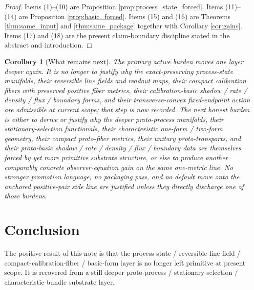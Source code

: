 \documentclass[11pt]{article}
\newtheorem{corollary}{Corollary}
\begin{document}
\begin{proof}
Items (1)--(10) are Proposition \ref{prop:process_state_forced}. Items (11)--(14) are Proposition \ref{prop:basic_forced}. Items (15) and (16) are Theorems \ref{thm:same_input} and \ref{thm:same_package} together with Corollary \ref{cor:gains}. Items (17) and (18) are the present claim-boundary discipline stated in the abstract and introduction.
\end{proof}

\begin{corollary}[What remains next]
\label{cor:what_next}
The primary active burden moves one layer deeper again. It is no longer to justify why the exact-preserving process-state manifolds, their reversible line fields and readout maps, their compact calibration fibers with preserved positive fiber metrics, their calibration-basic shadow / rate / density / flux / boundary forms, and their transverse-convex fixed-endpoint action are admissible at current scope; that step is now recorded. The next honest burden is either to derive or justify why the deeper proto-process manifolds, their stationary-selection functionals, their characteristic one-form / two-form geometry, their compact proto-fiber metrics, their unitary proto-transports, and their proto-basic shadow / rate / density / flux / boundary data are themselves forced by yet more primitive substrate structure, or else to produce another comparably concrete observer-equation gain on the same one-metric line. No stronger promotion language, no packaging pass, and no default move onto the anchored positive-pair side line are justified unless they directly discharge one of those burdens.
\end{corollary}

\section{Conclusion}

The positive result of this note is that the process-state / reversible-line-field / compact-calibration-fiber / basic-form layer is no longer left primitive at present scope. It is recovered from a still deeper proto-process / stationary-selection / characteristic-bundle substrate layer.
\end{document}
